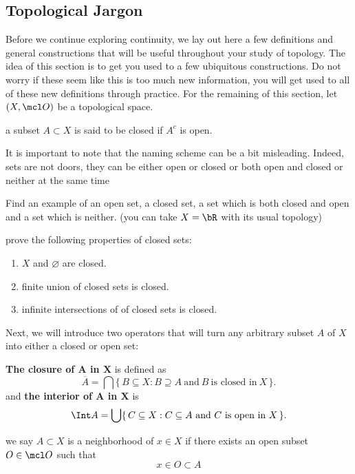 \documentclass{pset}
\begin{document}
\subsection{Topological Jargon}
Before we continue exploring continuity, we lay out here a few definitions and general constructions that will be useful throughout your study of topology. The idea of this section is to get you used to a few ubiquitous constructions. Do not worry if these seem like this is too much new information, you will get used to all of these new definitions through practice. For the remaining of this section, let $(X, \mcl O)$ be a topological space.
\begin{definition}
    a subset $A\subset X$ is said to be closed if $A^c$ is open.
\end{definition}
It is important to note that the naming scheme can be a bit misleading. Indeed, sets are not doors, they can be either open or closed or both open and closed or neither at the same time
\begin{exercise}[\skipforward]
    Find an example of an open set, a closed set, a set which is both closed and open and a set which is neither. (you can take $X=\bR$ with its usual topology)
\end{exercise}
\begin{exercise}
    prove the following properties of closed sets:
    \begin{enumerate}[label=\roman*.]
        \item $X$ and $\varnothing$ are closed.
        \item finite union of closed sets is closed.
        \item infinite intersections of of closed sets is closed.
    \end{enumerate}
\end{exercise}
Next, we will introduce two operators that will turn any arbitrary subset $A$ of $X$ into either a closed or open set: 
\begin{definition}
    \textbf{The closure of $\mathbf{A}$ in $\mathbf{X}$} is defined as
    \[
    \overline{A} = \bigcap \{\, B \subseteq X : B \supseteq A \ \text{and}\ B \ \text{is closed in}\ X \,\}.
    \]
    and \textbf{the interior of $\mathbf{A}$ in $\mathbf{X}$} is
    \[
    \Int A = \bigcup \{\, C \subseteq X : C \subseteq A \ \text{and}\ C \ \text{is open in}\ X \,\}.
    \]
\end{definition}
\begin{definition}
    we say $A\subset X$ is a neighborhood of $x\in X$ if there exists an open subset $O\in \mcl O$ such that
    \[x\in O\subset A\]
\end{definition}
\end{document}
